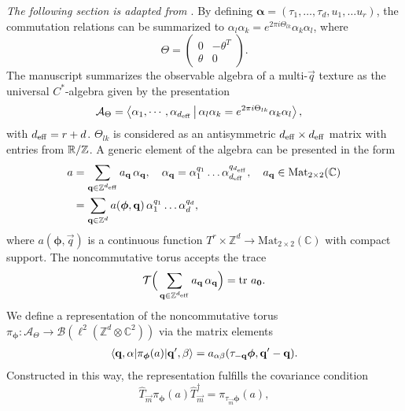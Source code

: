 \documentclass[
    aps,
    prb,
    twocolumn,
    floatfix,
    superscriptaddress,
	10pt
]{revtex4-2}
\begin{document}
{\it The following section is adapted from \cite{Liu2020}}.   By defining $\boldsymbol{\alpha}=(\tau_1, \ldots, \tau_d, u_1,\ldots u_r )$, the commutation relations can be summarized to $\alpha_l \alpha_k = e^{2 \pi i \Theta_{lk}} \alpha_k  \alpha_l$, where
\begin{equation}
    \Theta = \begin{pmatrix}
    0 & -\theta^T \\
    \theta & 0
    \end{pmatrix} .
\end{equation}
The manuscript summarizes the observable algebra of a multi-$\vec{q}$ texture as the universal $C^\ast$-algebra given by the presentation
\begin{align}
    \mathcal{A}_\Theta &= \Braket{ \alpha_1, \cdots, \alpha_{{d_\mathrm{eff}}}
    |  \alpha_l \alpha_k = e^{ 2 \pi i \Theta_{lk}} \alpha_k  \alpha_l },
\end{align}
with ${d_\mathrm{eff}} = r+ d$.
$ \Theta_{lk}$ is considered as an antisymmetric  ${d_\mathrm{eff}}\times {d_\mathrm{eff}}$  matrix with entries from ${\mathbb R}/{\mathbb Z}$.
A generic element of the algebra can be presented in the form
\begin{align}
a & = \sum_{\mathbf{q} \in {\mathbb Z}^{{d_\mathrm{eff}}}} a_{\mathbf{q}}
\, \alpha_{\mathbf{q}}, \quad \alpha_{\mathbf{q}} =\alpha_1^{q_1} \ldots\alpha_{d_\mathrm{eff}}^{q_{d_\mathrm{eff}}}, \quad a_{\mathbf{q}} \in \mathrm{Mat}_{2\times2} (\mathbb{C})
\notag \\
& = 	\sum_{\mathbf{q} \in {\mathbb Z}^{d}} a( \boldsymbol{\phi}, \mathbf{q}) 
\, 
\alpha_1^{q_1} \ldots\alpha_d^{q_d},
\end{align}
where $ a(\boldsymbol{\phi},\vec{q}) $  is a continuous function $T^r \times \mathbb{Z}^d \to \mathrm{Mat}_{2\times 2}(\mathbb{C})$ with compact support.
The noncommutative torus accepts the trace
\begin{equation}
	\mathcal{T} \Big(
		\sum_{\mathbf{q} \in {\mathbb Z}^{{d_\mathrm{eff}}}} a_{\mathbf{q}}
\, \alpha_{\mathbf{q}}
	\Big)
	= \mathrm{tr}~ a_{\mathbf{0}} .
\end{equation}
We define a representation of the noncommutative torus $\pi_{\boldsymbol{\phi}} \colon \mathcal{A}_\Theta \to \mathcal{B}(\ell^2(\mathbb{Z}^d \otimes \mathbb{C}^2))$ via the matrix elements
\begin{align}
	\braket{\mathbf{q}, \alpha
	|
	\pi_{\boldsymbol{\phi}} (a)
	| \mathbf{q}', \beta
	}
	=
	a_{\alpha \beta} ( \tau_{-\mathbf{q}} \boldsymbol{\phi}, \mathbf{q}'-\mathbf{q}) .
\end{align}
Constructed in this way, the representation fulfills the covariance condition
\begin{equation}
	\hat{T}_{\vec{m}}
	\pi_{\boldsymbol{\phi}} (a)
	\hat{T}_{\vec{m}}^\dagger
	= \pi_{\tau_{\vec{m}}\boldsymbol{\phi}} (a) ,
\end{equation}
\end{document}
